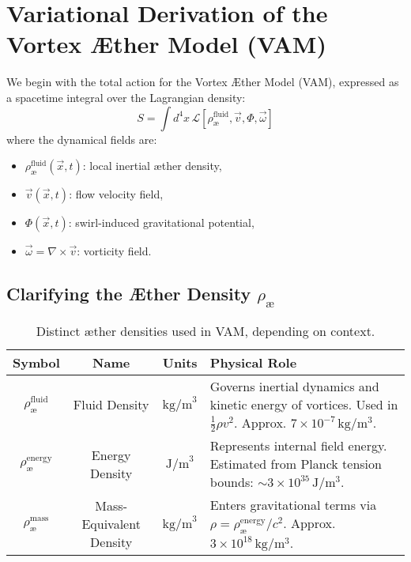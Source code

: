 \section{Variational Derivation of the Vortex \AE ther Model (VAM)}

We begin with the total action for the Vortex \AE ther Model (VAM), expressed as a spacetime integral over the Lagrangian density:
\begin{equation}
    S = \int d^4x \, \mathcal{L}[\rho_\text{\ae}^{\text{fluid}}, \vec{v}, \Phi, \vec{\omega}]
\end{equation}
where the dynamical fields are:
\begin{itemize}
    \item $\rho_\text{\ae}^{\text{fluid}}(\vec{x}, t)$: local inertial æther density,
    \item $\vec{v}(\vec{x}, t)$: flow velocity field,
    \item $\Phi(\vec{x}, t)$: swirl-induced gravitational potential,
    \item $\vec{\omega} = \nabla \times \vec{v}$: vorticity field.
\end{itemize}

\subsection*{Clarifying the Æther Density \( \rho_\text{\ae} \)}

\begin{table}[H]
\centering
\footnotesize
\renewcommand{\arraystretch}{1.3}
\begin{tabular}{|c|c|c|p{7.5cm}|}
\hline
\textbf{Symbol} & \textbf{Name} & \textbf{Units} & \textbf{Physical Role} \\
\hline
\( \rho_\text{\ae}^{\text{fluid}} \) & Fluid Density & \( \mathrm{kg/m}^3 \) & Governs inertial dynamics and kinetic energy of vortices. Used in \( \frac{1}{2} \rho v^2 \). Approx. \( 7 \times 10^{-7} \, \mathrm{kg/m^3} \). \\
\hline
\( \rho_\text{\ae}^{\text{energy}} \) & Energy Density & \( \mathrm{J/m}^3 \) & Represents internal field energy. Estimated from Planck tension bounds: \( \sim 3 \times 10^{35} \, \mathrm{J/m^3} \). \\
\hline
\( \rho_\text{\ae}^{\text{mass}} \) & Mass-Equivalent Density & \( \mathrm{kg/m}^3 \) & Enters gravitational terms via \( \rho = \rho_\text{\ae}^{\text{energy}}/c^2 \). Approx. \( 3 \times 10^{18} \, \mathrm{kg/m^3} \). \\
\hline
\end{tabular}
\caption{Distinct æther densities used in VAM, depending on context.}
\label{tab:ae_densities}
\end{table}


